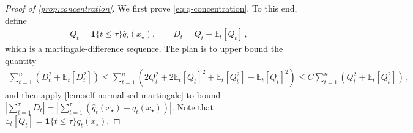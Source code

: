 \documentclass[11pt]{article}
\newcommand{\E}{\mathbb E}
\newcommand{\1}{\mathbf 1}
\begin{document}
\begin{proof}[Proof of \cref{prop:concentration}]
    We first prove \eqref{eq:q-concentration}.
    To this end, define
    \begin{align}
        Q_t
        =\1\{t\leq\tau\}\widehat q_t(x_\star),
        \qquad
        D_t
        =Q_t-\E_t[Q_t]\,,
    \end{align}
    which is a martingale-difference sequence.
    The plan is to upper bound the quantity
    \begin{align}
        \sum_{t=1}^n
        \left(D_t^2 + \E_t[D_t^2]\right)
        \leq
        \sum_{t=1}^n
        \left(
        2Q_t^2 + 2\E_t[Q_t]^2 +
        \E_t[Q_t^2] - \E_t[Q_t]^2
        \right)
        \leq
        C
        \sum_{t=1}^n
        \left(
        Q_t^2 + \E_t[Q_t^2]
        \right)
        \,,
        \label{eq:D-to-Q}
    \end{align}
    and then apply \cref{lem:self-normalised-martingale} to bound $\left|\sum_{t=1}^\tau D_t\right| = \left|\sum_{t=1}^\tau (\widehat q_t(x_\star) - q_t(x_\star))\right|$.
    Note that $\E_t[Q_t] = \1\{t\leq\tau\}q_t(x_\star)$.


\end{proof}
\end{document}
